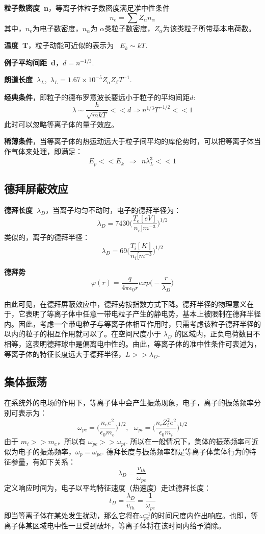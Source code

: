 \documentclass[UTF8]{ctexart}
\begin{document}
\textbf{粒子数密度\ n}，等离子体粒子数密度满足准中性条件
$$ n_e = \sum Z_\alpha n_\alpha $$
其中，$n_e$为电子数密度，$n_\alpha$为 $\alpha$类粒子数密度，$Z_\alpha$为该类粒子所带基本电荷数。

\textbf{温度\ T}，粒子动能可近似的表示为 \ $E_k \sim kT$.

\textbf{例子平均间距\ d}，$d = n^{-1/3}$.

\textbf{朗道长度\  $\lambda_L$},\   $\lambda _L = 1.67 \times 10^{-5} Z_\alpha Z_\beta T^{-1} $.

\textbf{经典条件}，即粒子的德布罗意波长要远小于粒子的平均间距$d$:
$$ \lambda \sim \frac h {\sqrt{mkT}} << d \Rightarrow n^{1/3} T^{-1/2} << 1$$
此时可以忽略等离子体的量子效应。

\textbf{稀薄条件}，当等离子体的热运动远大于粒子间平均的库伦势时，可以把等离子体当作气体来处理，即满足：
$$ \bar{E}_p << E_k\ \ \Rightarrow \ \ n\lambda^3_L << 1$$

\subsection{德拜屏蔽效应}
\textbf{德拜长度\ $\lambda_D$}，当离子均匀不动时，电子的德拜半径为：
$$\lambda_D = 7430\bigg(\frac{T_e[eV]}{n_e[m^{-3}}\bigg)^{1/2}$$
类似的，离子的德拜半径：
$$\lambda_D = 69\bigg(\frac{T_i[K]}{n_i[m^{-3}}\bigg)^{1/2}$$

\textbf{德拜势}
$$ \varphi (r) = \frac{q}{4 \pi \epsilon _0 r} exp\big( - \frac r{\lambda_D} \big)$$

由此可见，在德拜屏蔽效应中，德拜势按指数方式下降。德拜半径的物理意义在于，它表明了等离子体中任意一带电粒子产生的静电势，基本上被限制在德拜半径内。因此，考虑一个带电粒子与等离子体相互作用时，只需考虑该粒子德拜半径的以内的粒子的相互作用就可以了。在空间尺度小于 $\lambda_D$ 的区域内，正负电荷数目不相等，这表明德拜球中是偏离电中性的。由此，等离子体的准中性条件可表述为，等离子体的特征长度远大于德拜半径，$L >> \lambda_D$.

\subsection{集体振荡}
在系统外的电场的作用下，等离子体中会产生振荡现象，电子，离子的振荡频率分别可表示为：
$$\omega_{pe} = \big( \frac{n_e e^2}{\epsilon_0 m_e} \big) ^ {1/2},\ \ \ \omega_{pi} = \big( \frac{n_i Z_i^2 e^2}{\epsilon_0 m_i} \big) ^ {1/2}  $$
由于 $m_i >> m_e$，所以有 $\omega_{pe} >> \omega_{pi}$. 所以在一般情况下，集体的振荡频率可近似为电子的振荡频率，$\omega_p = \omega_{pe}$. 德拜长度与振荡频率都是等离子体集体行为的特征参量，有如下关系：
$$ \lambda_D = \frac{v_{th}}{\omega_{pe}}$$
定义响应时间为，电子以平均特征速度（热速度）走过德拜长度：
$$ t_D = \frac{\lambda_D}{v_{th}} = \frac 1{\omega_{pe}}$$
即当等离子体在某处发生扰动，那么它将在$\omega_{pe}^{-1}$的时间尺度内作出响应。也即，等离子体某区域电中性一旦受到破坏，等离子体将在该时间内给予消除。
\end{document}
